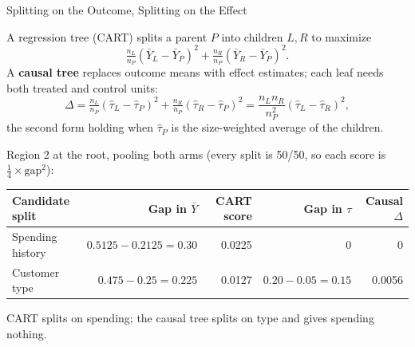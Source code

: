 \documentclass[aspectratio=169, 11pt, handout]{beamer}
\newcommand{\hatt}{\hat{\tau}}
\begin{document}
\begin{frame}{Splitting on the Outcome, Splitting on the Effect}

A regression tree (CART) splits a parent $P$ into children $L, R$ to maximize
\[
\tfrac{n_L}{n_P}(\bar Y_L - \bar Y_P)^2 + \tfrac{n_R}{n_P}(\bar Y_R - \bar Y_P)^2 .
\]
A \textbf{causal tree} replaces outcome means with effect estimates; each leaf needs both treated and control units:
\[
\Delta = \tfrac{n_L}{n_P}(\hatt_L - \hatt_P)^2 + \tfrac{n_R}{n_P}(\hatt_R - \hatt_P)^2 = \frac{n_L n_R}{n_P^2}(\hatt_L - \hatt_R)^2 ,
\]
the second form holding when $\hatt_P$ is the size-weighted average of the children.

\medskip

Region 2 at the root, pooling both arms (every split is 50/50, so each score is $\tfrac14 \times \text{gap}^2$):

\begin{center}
\small
\begin{tabular}{lrrrr}
\toprule
\textbf{Candidate split} & \textbf{Gap in $\bar Y$} & \textbf{CART score} & \textbf{Gap in $\tau$} & \textbf{Causal $\Delta$} \\
\midrule
Spending history & $0.5125 - 0.2125 = 0.30$ & 0.0225 & 0 & \textcolor{warnred}{0} \\
Customer type & $0.475 - 0.25 = 0.225$ & 0.0127 & $0.20 - 0.05 = 0.15$ & \textcolor{sbgreen}{0.0056} \\
\bottomrule
\end{tabular}
\end{center}

\smallskip

CART splits on spending; the causal tree splits on type and gives spending nothing.
\end{frame}
\end{document}
